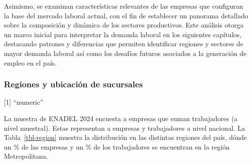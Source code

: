 \documentclass[
  11pt,
]{article}
\begin{document}
Asimismo, se examinan características relevantes de las empresas que
configuran la base del mercado laboral actual, con el fin de establecer
un panorama detallado sobre la composición y dinámica de los sectores
productivos. Este análisis otorga un marco inicial para interpretar la
demanda laboral en los siguientes capítulos, destacando patrones y
diferencias que permiten identificar regiones y sectores de mayor
demanda laboral así como los desafíos futuros asociados a la generación
de empleo en el país.

\FloatBarrier

\subsubsection{Regiones y ubicación de
sucursales}\label{regiones-y-ubicaciuxf3n-de-sucursales}

{[}1{]} ``numeric''

La muestra de ENADEL 2024 encuesta a  empresas que suman
 trabajadores (a nivel
muestral). Estas representan a 
empresas y  trabajadores a
nivel nacional. La Tabla~\ref{tbl-region} muestra la distribución en las
distintas regiones del país, dónde un \% de las empresas y un
\% de los trabajadores se encuentran en la región
Metropolitana.

\vspace{5mm}

\FloatBarrier
\end{document}
